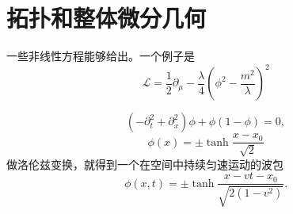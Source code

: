 \section{拓扑和整体微分几何}

一些非线性方程能够给出。一个例子是
\begin{equation}
    \mathcal{L} = \frac{1}{2} \partial_\mu - \frac{\lambda}{4} \left(\phi^2 - \frac{m^2}{\lambda} \right)^2
\end{equation}

\begin{equation}
    (-\partial_t^2 + \partial_x^2) \phi + \phi ( 1- \phi) = 0,
\end{equation}
\begin{equation}
    \phi(x) = \pm \tanh \frac{x - x_0}{\sqrt{2}}
\end{equation}
做洛伦兹变换，就得到一个在空间中持续匀速运动的波包
\begin{equation}
    \phi(x, t) = \pm \tanh \frac{x - vt - x_0}{\sqrt{2(1-v^2)}}.
\end{equation}